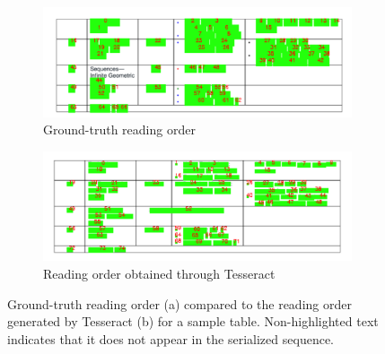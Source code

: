 \begin{figure}
    \centering
    \small
      \begin{subfigure}[b]{\textwidth}
        \includegraphics[width=\textwidth]{images/chapter4/gold_tables.pdf}
        \caption{Ground-truth reading order}
      \end{subfigure}
      \begin{subfigure}[b]{\textwidth}
        \includegraphics[width=\textwidth]{images/chapter4/tesseract_tables.pdf}
        \caption{Reading order obtained through Tesseract}
      \end{subfigure}
    \caption{Ground-truth reading order (a) compared to the reading order generated by Tesseract (b) for a sample table. Non-highlighted text indicates that it does not appear in the serialized sequence.}
    \label{fig:reading-orders-table}
\end{figure}

